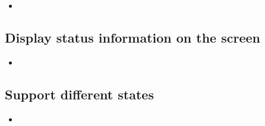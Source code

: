 \begin{itemize}
	\item
\end{itemize}

\subsection{Display status information on the screen}

\begin{itemize}
	\item
\end{itemize}

\subsection{Support different states}

\begin{itemize}
	\item
\end{itemize}